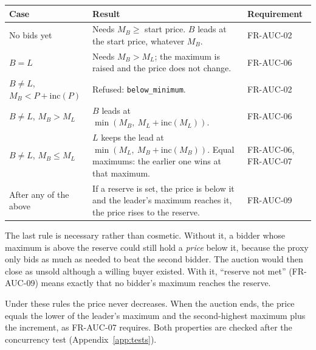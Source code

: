 \documentclass[11pt,a4paper]{article}
\begin{document}
\begin{center}
\small
\begin{tabularx}{\textwidth}{@{}>{\raggedright\arraybackslash}p{4.2cm} X >{\raggedright\arraybackslash}p{2.4cm}@{}}
\toprule
\textbf{Case} & \textbf{Result} & \textbf{Requirement} \\ \midrule
No bids yet & Needs $M_B \ge$ start price. $B$ leads at the start price, whatever $M_B$. & FR-AUC-02 \\
$B = L$ & Needs $M_B > M_L$; the maximum is raised and the price does not change. & FR-AUC-06 \\
$B \ne L$, $M_B < P + \mathrm{inc}(P)$ & Refused: \texttt{below\_minimum}. & FR-AUC-02 \\
$B \ne L$, $M_B > M_L$ & $B$ leads at $\min(M_B,\ M_L + \mathrm{inc}(M_L))$. & FR-AUC-06 \\
$B \ne L$, $M_B \le M_L$ & $L$ keeps the lead at $\min(M_L,\ M_B + \mathrm{inc}(M_B))$. Equal maximums: the earlier one wins at that maximum. & FR-AUC-06, FR-AUC-07 \\
After any of the above & If a reserve is set, the price is below it and the leader's maximum reaches it, the price rises to the reserve. & FR-AUC-09 \\
\bottomrule
\end{tabularx}
\end{center}

The last rule is necessary rather than cosmetic. Without it, a bidder whose maximum is above the reserve could still hold a \emph{price} below it, because the proxy only bids as much as needed to beat the second bidder. The auction would then close as unsold although a willing buyer existed. With it, ``reserve not met'' (FR-AUC-09) means exactly that no bidder's maximum reaches the reserve.

Under these rules the price never decreases. When the auction ends, the price equals the lower of the leader's maximum and the second-highest maximum plus the increment, as FR-AUC-07 requires. Both properties are checked after the concurrency test (Appendix~\ref{app:tests}).
\end{document}
